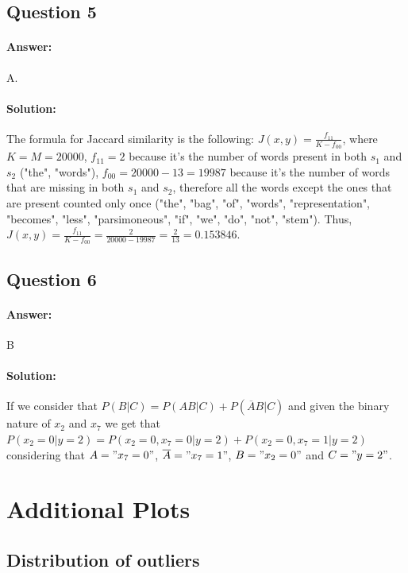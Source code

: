 \documentclass[11pt,a4paper]{article}
\begin{document}
\subsection{Question 5}

\paragraph*{Answer:} A.
\paragraph*{Solution:} The formula for Jaccard similarity is the following: $J(x,y) = \frac{f_{11}}{K-f_{00}}$, where $K = M = 20000$, $f_{11} = 2$ because it's the number of words present in both $s_1$ and $s_2$ ("the", "words"), $f_{00} = 20000 - 13 = 19987$ because it's the number of words that are missing in both $s_1$ and $s_2$, therefore all the words except the ones that are present counted only once ("the", "bag", "of", "words", "representation", "becomes", "less", "parsimoneous", "if", "we", "do", "not", "stem"). Thus, $J(x,y) = \frac{f_{11}}{K-f_{00}} = \frac{2}{20000 - 19987}= \frac{2}{13} = 0.153846$. 

\subsection{Question 6}

\paragraph*{Answer:} B
\paragraph*{Solution:} If we consider that $P(B|C) = P(AB|C) + P(\overline{A}B|C)$ and given the binary nature of $x_2$ and $x_7$ we get that $P(x_2 = 0 | y = 2) = P(x_2 = 0, x_7 = 0 | y = 2) + P(x_2 = 0, x_7 = 1 | y = 2) $ considering that $A = "x_7 = 0"$, $\overline{A} = "x_7 = 1"$, $B = "x_2 = 0"$ and $C = "y = 2"$.

\section{Additional Plots}
\label{appendix:plots}
\subsection{Distribution of outliers}
\end{document}
